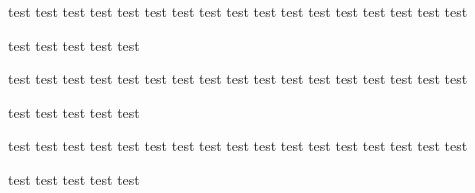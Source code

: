 ﻿\documentclass{ctexart}
\begin{document}
    test test test test test test test test test test test test test test test test test\par\hspace{10em} test test test test test 

    test test test test test test test test test test test test test test test test test\hspace*{10em}\par test test test test test 

    test test test test test test test test test test test test test test test test test\par\hspace*{10em} test test test test test 


\newpage
\end{document}

